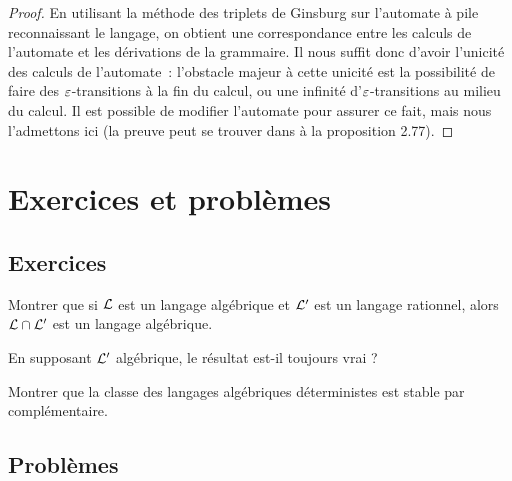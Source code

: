 \begin{proof}
  En utilisant la méthode des triplets de Ginsburg sur l'automate à pile
  reconnaissant le langage, on obtient une correspondance entre les calculs de
  l'automate et les dérivations de la grammaire. Il nous suffit donc d'avoir
  l'unicité des calculs de l'automate~: l'obstacle majeur à cette unicité est la
  possibilité de faire des $\varepsilon$-transitions à la fin du calcul, ou une
  infinité d'$\varepsilon$-transitions au milieu du calcul. Il est possible de modifier
  l'automate pour assurer ce fait, mais nous l'admettons ici (la preuve peut se
  trouver dans \cite{Carton2014} à la proposition 2.77).
\end{proof}

\clearpage

\section{Exercices et problèmes}

\subsection{Exercices}

\begin{exercise}
  Montrer que si $\mathcal L$ est un langage algébrique et $\mathcal L'$ est un
  langage rationnel, alors $\mathcal L \cap \mathcal L'$ est un langage
  algébrique.

  En supposant $\mathcal L'$ algébrique, le résultat est-il toujours vrai ?
\end{exercise}

\begin{exercise}
  Montrer que la classe des langages algébriques déterministes est stable par
  complémentaire.
\end{exercise}

\clearpage

\subsection{Problèmes}

